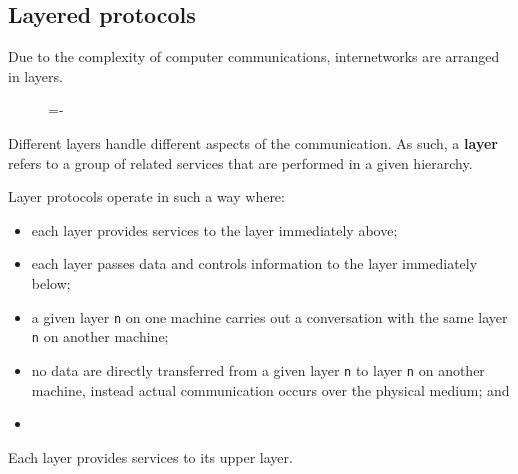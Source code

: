 \documentclass[a4paper]{systems-software}
\begin{document}
\subsection*{Layered protocols}

Due to the complexity of computer communications, internetworks are arranged in layers.

\begin{figure}[H]
	\lineskip=-\fboxrule
\end{figure}

Different layers handle different aspects of the communication. As such, a \textbf{layer} refers to a group of related services that are performed in a given hierarchy.

Layer protocols operate in such a way where:
\begin{itemize}
	\item each layer provides services to the layer immediately above;
	\item each layer passes data and controls information to the layer immediately below;
	\item a given layer \texttt{n} on one machine carries out a conversation with the same layer \texttt{n} on another machine;
	\item no data are directly transferred from a given layer \texttt{n} to layer \texttt{n} on another machine, instead actual communication occurs over the physical medium; and
	\item 
\end{itemize}
Each layer provides services to its upper layer.
\end{document}
